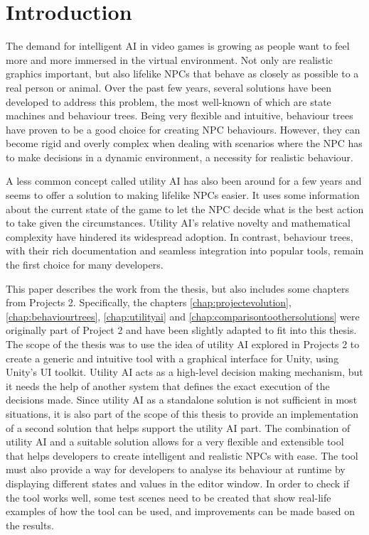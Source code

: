 \chapter{Introduction}
\label{chap:introduction}

The demand for intelligent AI in video games is growing as people want to feel more and more immersed in the virtual environment. Not only are realistic graphics important, but also lifelike NPCs that behave as closely as possible to a real person or animal. Over the past few years, several solutions have been developed to address this problem, the most well-known of which are state machines and behaviour trees. Being very flexible and intuitive, behaviour trees have proven to be a good choice for creating NPC behaviours. However, they can become rigid and overly complex when dealing with scenarios where the NPC has to make decisions in a dynamic environment, a necessity for realistic behaviour.

A less common concept called utility AI has also been around for a few years and seems to offer a solution to making lifelike NPCs easier. It uses some information about the current state of the game to let the NPC decide what is the best action to take given the circumstances. Utility AI's relative novelty and mathematical complexity have hindered its widespread adoption. In contrast, behaviour trees, with their rich documentation and seamless integration into popular tools, remain the first choice for many developers.

This paper describes the work from the thesis, but also includes some chapters from Projects 2. Specifically, the chapters \ref{chap:projectevolution}, \ref{chap:behaviourtrees}, \ref{chap:utilityai} and \ref{chap:comparisontoothersolutions} were originally part of Project 2 and have been slightly adapted to fit into this thesis. The scope of the thesis was to use the idea of utility AI explored in Projects 2 to create a generic and intuitive tool with a graphical interface for Unity, using Unity's UI toolkit. Utility AI acts as a high-level decision making mechanism, but it needs the help of another system that defines the exact execution of the decisions made. Since utility AI as a standalone solution is not sufficient in most situations, it is also part of the scope of this thesis to provide an implementation of a second solution that helps support the utility AI part. The combination of utility AI and a suitable solution allows for a very flexible and extensible tool that helps developers to create intelligent and realistic NPCs with ease. The tool must also provide a way for developers to analyse its behaviour at runtime by displaying different states and values in the editor window. In order to check if the tool works well, some test scenes need to be created that show real-life examples of how the tool can be used, and improvements can be made based on the results.

